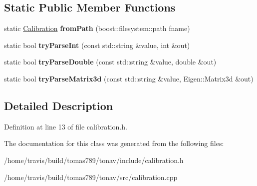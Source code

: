 \subsection*{Static Public Member Functions}
\begin{DoxyCompactItemize}
\item 
\hypertarget{class_calibration_a407d16502f36acfc7bd00572abe90739}{static \hyperlink{class_calibration}{Calibration} {\bfseries from\-Path} (boost\-::filesystem\-::path fname)}\label{class_calibration_a407d16502f36acfc7bd00572abe90739}

\item 
\hypertarget{class_calibration_a1d1c3b1b92ae75db9428f61b7afcc7f0}{static bool {\bfseries try\-Parse\-Int} (const std\-::string \&value, int \&out)}\label{class_calibration_a1d1c3b1b92ae75db9428f61b7afcc7f0}

\item 
\hypertarget{class_calibration_a043fc49ab017f6188dfb1b38cf7b573e}{static bool {\bfseries try\-Parse\-Double} (const std\-::string \&value, double \&out)}\label{class_calibration_a043fc49ab017f6188dfb1b38cf7b573e}

\item 
\hypertarget{class_calibration_a58c12342c94ea075107e6202e67c714a}{static bool {\bfseries try\-Parse\-Matrix3d} (const std\-::string \&value, Eigen\-::\-Matrix3d \&out)}\label{class_calibration_a58c12342c94ea075107e6202e67c714a}

\end{DoxyCompactItemize}


\subsection{Detailed Description}


Definition at line 13 of file calibration.\-h.



The documentation for this class was generated from the following files\-:\begin{DoxyCompactItemize}
\item 
/home/travis/build/tomas789/tonav/include/calibration.\-h\item 
/home/travis/build/tomas789/tonav/src/calibration.\-cpp\end{DoxyCompactItemize}
